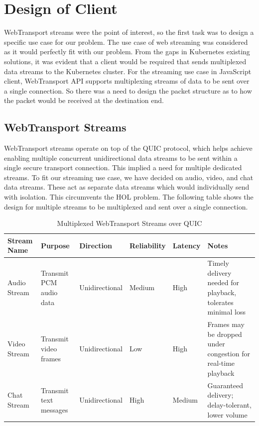 \section{Design of Client}
WebTransport streams were the point of interest, so the first task was to design a specific use case for our problem. The use case of web streaming was considered as it would perfectly fit with our problem. From the gaps in Kubernetes existing solutions, it was evident that a client would be required that sends multiplexed data streams to the Kubernetes cluster. For the streaming use case in JavaScript client, WebTransport API supports multiplexing streams of data to be sent over a single connection. So there was a need to design the packet structure as to how the packet would be received at the destination end. 

\subsection{WebTransport Streams}
WebTransport streams operate on top of the QUIC protocol, which helps achieve enabling multiple concurrent unidirectional data streams to be sent within a single secure transport connection. This implied a need for multiple dedicated streams. To fit our streaming use case, we have decided on audio, video, and chat data streams. These act as separate data streams which would individually send with isolation. This circumvents the HOL problem. The following table shows the design for multiple streams to be multiplexed and sent over a single connection.


\begin{table}[h!]
\renewcommand{\arraystretch}{0.9}
\small
\centering
\begin{tabularx}{\textwidth}{|l|X|l|l|l|X|}
\hline
\textbf{Stream Name} & \textbf{Purpose} & \textbf{Direction} & \textbf{Reliability} & \textbf{Latency} & \textbf{Notes} \\
\hline
Audio Stream & Transmit PCM audio data & Unidirectional & Medium & High & Timely delivery needed for playback, tolerates minimal loss \\
\hline
Video Stream & Transmit video frames & Unidirectional & Low & High & Frames may be dropped under congestion for real-time playback \\
\hline
Chat Stream & Transmit text messages & Unidirectional & High & Medium & Guaranteed delivery; delay-tolerant, lower volume \\
\hline
\end{tabularx}
\caption{Multiplexed WebTransport Streams over QUIC}
\label{tab:webtransport-streams}
\end{table}






